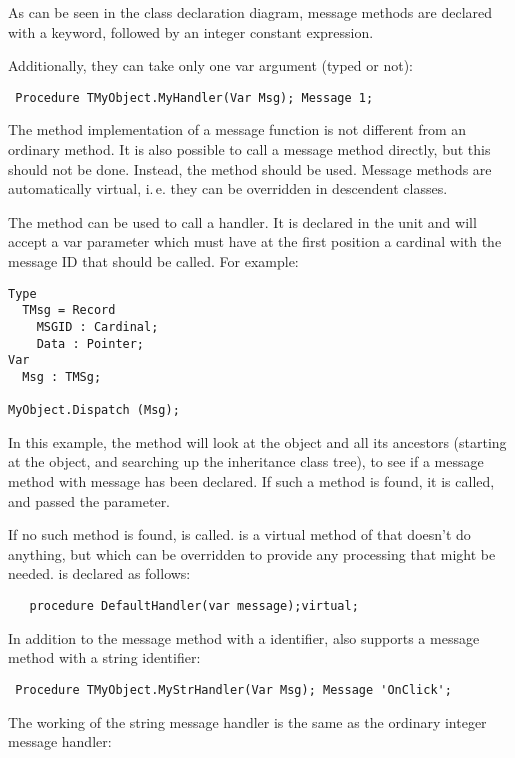 As can be seen in the class declaration diagram, message methods are
declared with a  keyword, followed by an integer constant
expression.

Additionally, they can take only one var argument (typed or not):
\begin{verbatim}
 Procedure TMyObject.MyHandler(Var Msg); Message 1;
\end{verbatim}
The method implementation of a message function is not different from an
ordinary method. It is also possible to call a message method directly,
but this should not be done. Instead, the  method
should be used. Message methods are automatically virtual,
i.\,e. they can be overridden in descendent classes.

The  method can be used to call a
handler. It is declared in the  unit and will accept a var
parameter  which must have at the first position a cardinal with the
message ID that should be called. For example:
\begin{verbatim}
Type
  TMsg = Record
    MSGID : Cardinal;
    Data : Pointer;
Var
  Msg : TMSg;

MyObject.Dispatch (Msg);
\end{verbatim}
In this example, the  method will look at the object and all
its ancestors (starting at the object, and searching up the inheritance
class tree), to see if a message method with message  has been
declared. If such a method is found, it is called, and passed the
 parameter.

If no such method is found,  is called.
 is a virtual method of  that doesn't do
anything, but which can be overridden to provide any processing that might be
needed.  is declared as follows:
\begin{verbatim}
   procedure DefaultHandler(var message);virtual;
\end{verbatim}

In addition to the message method with a  identifier,
\fpc also supports a message method with a string identifier:
\begin{verbatim}
 Procedure TMyObject.MyStrHandler(Var Msg); Message 'OnClick';
\end{verbatim}
The working of the string message handler is the same as the ordinary
integer message handler:

